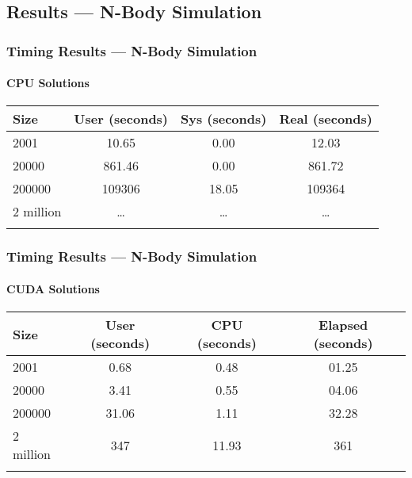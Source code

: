 \documentclass{beamer}
\begin{document}
\subsection{Results --- N-Body Simulation}
\begin{frame}
\frametitle{Timing Results --- N-Body Simulation}
\framesubtitle{CPU Solutions}
\begin{table}[htb]
\centering{}
\begin{tabular}{lccc}
\toprule{}
\textbf{Size} & \textbf{User (seconds)} &
\textbf{Sys (seconds)} & \textbf{Real (seconds)} \\
\midrule{}
2001          & 10.65   & 0.00    & 12.03 \\
\midrule{}
20000         & 861.46  & 0.00    & 861.72 \\
\midrule{}
200000        & 109306  & 18.05   & 109364 \\
\midrule{}
2 million     & \dots{} & \dots{} & \dots{} \\
\bottomrule{}
\end{tabular}
\end{table}
\end{frame}
\begin{frame}
\frametitle{Timing Results --- N-Body Simulation}
\framesubtitle{CUDA Solutions}
\begin{table}[htb]
\centering{}
\begin{tabular}{lccc}
\toprule{}
\textbf{Size} & \textbf{User (seconds)} &
\textbf{CPU (seconds)} & \textbf{Elapsed (seconds)} \\
\midrule{}
2001          & 0.68    & 0.48    & 01.25 \\
\midrule{}
20000         & 3.41    & 0.55    & 04.06 \\
\midrule{}
200000        & 31.06   & 1.11    & 32.28 \\
\midrule{}
2 million     & 347     & 11.93   & 361   \\
\bottomrule{}
\end{tabular}
\end{table}
\end{frame}
\end{document}
